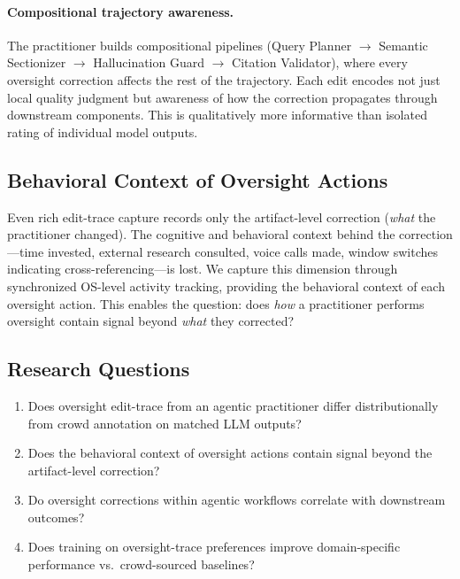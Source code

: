 \documentclass[11pt]{article}
\begin{document}
\paragraph{Compositional trajectory awareness.}
The practitioner builds compositional pipelines (Query Planner $\to$ Semantic Sectionizer $\to$ Hallucination Guard $\to$ Citation Validator), where every oversight correction affects the rest of the trajectory.
Each edit encodes not just local quality judgment but awareness of how the correction propagates through downstream components.
This is qualitatively more informative than isolated rating of individual model outputs.

\subsection{Behavioral Context of Oversight Actions}
\label{sec:behavioral-context-intro}

Even rich edit-trace capture records only the artifact-level correction (\emph{what} the practitioner changed).
The cognitive and behavioral context behind the correction---time invested, external research consulted, voice calls made, window switches indicating cross-referencing---is lost.
We capture this dimension through synchronized OS-level activity tracking, providing the behavioral context of each oversight action.
This enables the question: does \emph{how} a practitioner performs oversight contain signal beyond \emph{what} they corrected?

\subsection{Research Questions}
\label{sec:rqs}

\begin{enumerate}[label=\textbf{RQ\arabic*},leftmargin=2.5em]
  \item Does oversight edit-trace from an agentic practitioner differ distributionally from crowd annotation on matched LLM outputs?
  \item Does the behavioral context of oversight actions contain signal beyond the artifact-level correction?
  \item Do oversight corrections within agentic workflows correlate with downstream outcomes?
  \item Does training on oversight-trace preferences improve domain-specific performance vs.\ crowd-sourced baselines?
\end{enumerate}
\end{document}
